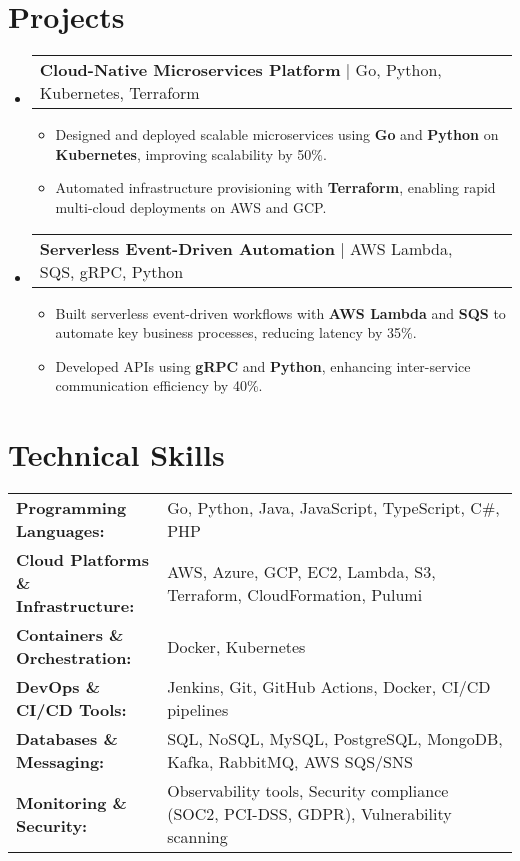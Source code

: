 \documentclass[letterpaper,11pt]{article}
\makeatletter
\newcommand{\resumeItem}[1]{
  \item\footnotesize{
    {#1 \vspace{-2pt}}
  }
}
\newcommand{\resumeProjectHeading}[2]{
    \item
    \begin{tabular*}{1.001\textwidth}{l@{\extracolsep{\fill}}r}
      \small#1 & \textbf{\small #2}\\
    \end{tabular*}\vspace{-7pt}
}
\newcommand{\resumeSubHeadingListStart}{\begin{itemize}[leftmargin=0pt, label={}]}
\newcommand{\resumeSubHeadingListEnd}{\end{itemize}}
\newcommand{\resumeItemListStart}{\begin{itemize}[leftmargin=*]}
\newcommand{\resumeItemListEnd}{\end{itemize}\vspace{-5pt}}
\makeatother
\begin{document}
\section{Projects}
    \vspace{-5pt}
    \resumeSubHeadingListStart
      \resumeProjectHeading
          {\textbf{Cloud-Native Microservices Platform} | Go, Python, Kubernetes, Terraform}
          {}
          \resumeItemListStart
              \resumeItem{Designed and deployed scalable microservices using \textbf{Go} and \textbf{Python} on \textbf{Kubernetes}, improving scalability by 50\%.}
              \resumeItem{Automated infrastructure provisioning with \textbf{Terraform}, enabling rapid multi-cloud deployments on AWS and GCP.}
          \resumeItemListEnd
          \vspace{-16pt}
      \resumeProjectHeading
          {\textbf{Serverless Event-Driven Automation} | AWS Lambda, SQS, gRPC, Python}
          {}
          \resumeItemListStart
              \resumeItem{Built serverless event-driven workflows with \textbf{AWS Lambda} and \textbf{SQS} to automate key business processes, reducing latency by 35\%.}
              \resumeItem{Developed APIs using \textbf{gRPC} and \textbf{Python}, enhancing inter-service communication efficiency by 40\%.}
          \resumeItemListEnd
    \resumeSubHeadingListEnd
\vspace{-10pt}
\section{Technical Skills}
        \vspace{-14pt}
        \begin{table}[h]
            \footnotesize
            \begin{tabular}{p{0.3\linewidth} p{0.7\linewidth}}
                \textbf{Programming Languages:} & Go, Python, Java, JavaScript, TypeScript, C\#, PHP \\
                \textbf{Cloud Platforms \& Infrastructure:} & AWS, Azure, GCP, EC2, Lambda, S3, Terraform, CloudFormation, Pulumi \\
                \textbf{Containers \& Orchestration:} & Docker, Kubernetes \\
                \textbf{DevOps \& CI/CD Tools:} & Jenkins, Git, GitHub Actions, Docker, CI/CD pipelines \\
                \textbf{Databases \& Messaging:} & SQL, NoSQL, MySQL, PostgreSQL, MongoDB, Kafka, RabbitMQ, AWS SQS/SNS \\
                \textbf{Monitoring \& Security:} & Observability tools, Security compliance (SOC2, PCI-DSS, GDPR), Vulnerability scanning \\
            \end{tabular}
        \end{table}
\end{document}
